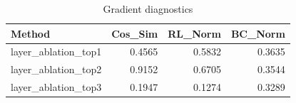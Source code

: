 \begin{table}[htbp]
\centering
\caption{Gradient diagnostics}
\label{tab:grad-diag}
\begin{tabular}{lrrr}
\toprule
\textbf{Method} & \textbf{Cos\_Sim} & \textbf{RL\_Norm} & \textbf{BC\_Norm} \\
\midrule
layer\_ablation\_top1 & 0.4565 & 0.5832 & 0.3635 \\
layer\_ablation\_top2 & 0.9152 & 0.6705 & 0.3544 \\
layer\_ablation\_top3 & 0.1947 & 0.1274 & 0.3289 \\
\bottomrule
\end{tabular}
\end{table}